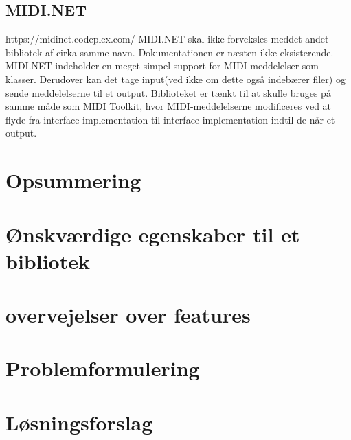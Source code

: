\subsection{MIDI.NET}
https://midinet.codeplex.com/ 
MIDI.NET skal ikke forveksles meddet andet bibliotek af cirka samme navn. Dokumentationen er næsten ikke eksisterende.
MIDI.NET indeholder en meget simpel support for MIDI-meddelelser som klasser. Derudover kan det tage input(ved ikke om dette også indebærer filer) og sende meddelelserne til et output. Biblioteket er tænkt til at skulle bruges på samme måde som MIDI Toolkit, hvor MIDI-meddelelserne modificeres ved at flyde fra interface-implementation til interface-implementation indtil de når et output. 

\section{Opsummering}

\section{Ønskværdige egenskaber til et bibliotek}

\section{overvejelser over features}

\section{Problemformulering}

\section{Løsningsforslag}


